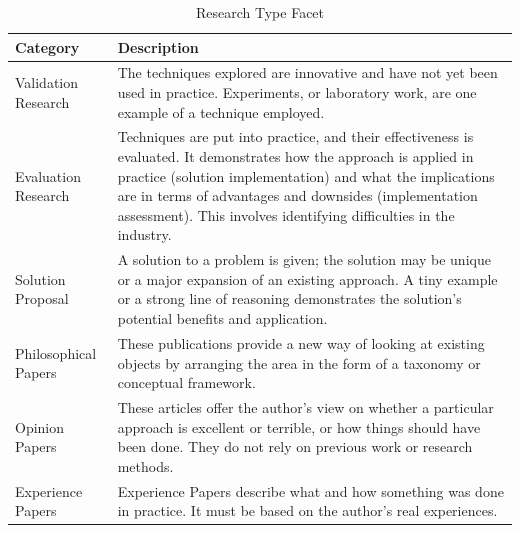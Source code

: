             \begin{table}[h]
                \centering
        	    {
        	    \begin{tabular}{ | m{2cm} | m{12.5cm} | }
                    \hline
                    \rowcolor{teal!30} \textbf{Category} & \textbf{Description} \\
                    
                    \hline
                    Validation Research  & The techniques explored are innovative and have not yet been used in practice. Experiments, or laboratory work, are one example of a technique employed.\\
                    
                    \hline
                    Evaluation Research & Techniques are put into practice, and their effectiveness is evaluated. It demonstrates how the approach is applied in practice (solution implementation) and what the implications are in terms of advantages and downsides (implementation assessment). This involves identifying difficulties in the industry.\\
                    
                    \hline
                    Solution Proposal  & A solution to a problem is given; the solution may be unique or a major expansion of an existing approach. A tiny example or a strong line of reasoning demonstrates the solution's potential benefits and application.\\
                    
                    \hline
                    Philosophical Papers  & These publications provide a new way of looking at existing objects by arranging the area in the form of a taxonomy or conceptual framework.\\
                    
                    \hline
                    Opinion Papers  & These articles offer the author's view on whether a particular approach is excellent or terrible, or how things should have been done. They do not rely on previous work or research methods.\\
                    
                    \hline
                    Experience Papers  & Experience Papers describe what and how something was done in practice. It must be based on the author's real experiences.\\
                    
                    \hline
                \end{tabular}}
                \caption{\label{tab:research-ty-face} Research Type Facet}
            \end{table}

